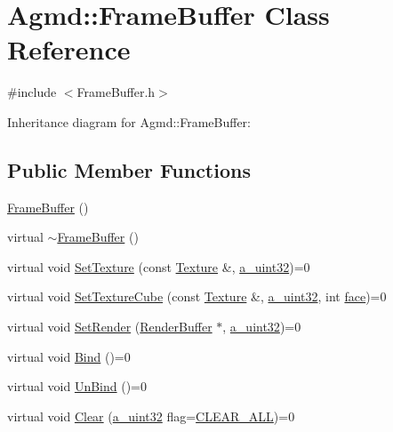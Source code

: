 \hypertarget{class_agmd_1_1_frame_buffer}{\section{Agmd\+:\+:Frame\+Buffer Class Reference}
\label{class_agmd_1_1_frame_buffer}
}


{\ttfamily \#include $<$Frame\+Buffer.\+h$>$}



Inheritance diagram for Agmd\+:\+:Frame\+Buffer\+:
\subsection*{Public Member Functions}
\begin{DoxyCompactItemize}
\item 
\hyperlink{class_agmd_1_1_frame_buffer_a4c4496f6f37c392bccf0e2e40c96c41e}{Frame\+Buffer} ()
\item 
virtual \hyperlink{class_agmd_1_1_frame_buffer_a8a63285b76eb2c7c2b70e28b96c2b15f}{$\sim$\+Frame\+Buffer} ()
\item 
virtual void \hyperlink{class_agmd_1_1_frame_buffer_a76ffe93cffad0a95befbee4dc575487a}{Set\+Texture} (const \hyperlink{class_agmd_1_1_texture}{Texture} \&, \hyperlink{_common_defines_8h_a964296f9770051b9e4807b1f180dd416}{a\+\_\+uint32})=0
\item 
virtual void \hyperlink{class_agmd_1_1_frame_buffer_a8586a1e4fa08ec43a21f73139fa01fba}{Set\+Texture\+Cube} (const \hyperlink{class_agmd_1_1_texture}{Texture} \&, \hyperlink{_common_defines_8h_a964296f9770051b9e4807b1f180dd416}{a\+\_\+uint32}, int \hyperlink{_planet_8cpp_ae1161f79bdbe47164b23549af2139d25}{face})=0
\item 
virtual void \hyperlink{class_agmd_1_1_frame_buffer_ab31c37e22dba1f299186026d597d7377}{Set\+Render} (\hyperlink{class_agmd_1_1_render_buffer}{Render\+Buffer} $\ast$, \hyperlink{_common_defines_8h_a964296f9770051b9e4807b1f180dd416}{a\+\_\+uint32})=0
\item 
virtual void \hyperlink{class_agmd_1_1_frame_buffer_adbe54d16610cf433ed300797795d51f4}{Bind} ()=0
\item 
virtual void \hyperlink{class_agmd_1_1_frame_buffer_a8e656e8cdc0a35da9ef7ce8cfc162b25}{Un\+Bind} ()=0
\item 
virtual void \hyperlink{class_agmd_1_1_frame_buffer_a2ea4be225c7cfab68f85329022651b80}{Clear} (\hyperlink{_common_defines_8h_a964296f9770051b9e4807b1f180dd416}{a\+\_\+uint32} flag=\hyperlink{namespace_agmd_aeb00eaafdbba0fbe6b35d082f4ba0123a71cd6105bdf489841066bcc89fc2938b}{C\+L\+E\+A\+R\+\_\+\+A\+L\+L})=0

\end{DoxyCompactItemize}
